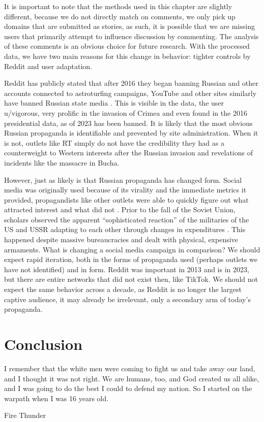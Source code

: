 \documentclass[doublespacing]{utdthesis}
\let\cite=\citep
\begin{document}
It is important to note that the methods used in this chapter are slightly different, because we do not directly match on comments, we only pick up domains that are submitted as stories, as such, it is possible that we are missing users that primarily attempt to influence discussion by commenting.
The analysis of these comments is an obvious choice for future research.
With the processed data, we have two main reasons for this change in behavior: tighter controls by Reddit and user adaptation.

Reddit has publicly stated that after 2016 they began banning Russian and other accounts connected to astroturfing campaigns, YouTube and other sites similarly have banned Russian state media \cite{browne2018}.
This is visible in the data, the user u/vigorous, very prolific in the invasion of Crimea and even found in the 2016 presidential data, as of 2023 has been banned.
It is likely that the most obvious Russian propaganda is identifiable and prevented by site administration.
When it is not, outlets like RT simply do not have the credibility they had as a counterweight to Western interests after the Russian invasion and revelations of incidents like the massacre in Bucha. 

However, just as likely is that Russian propaganda has changed form.
Social media was originally used because of its virality and the immediate metrics it provided, propagandists like other outlets were able to quickly figure out what attracted interest and what did not \cite[p. 28]{woolley2018}.
Prior to the fall of the Soviet Union, scholars observed the apparent ``sophisticated reaction'' of the militaries of the US and USSR adapting to each other through changes in expenditures \cite{williams1988}. 
This happened despite massive bureaucracies and dealt with physical, expensive armaments.
What is changing a social media campaign in comparison?
We should expect rapid iteration, both in the forms of propaganda used (perhaps outlets we have not identified) and in form.
Reddit was important in 2013 and is in 2023, but there are entire networks that did not exist then, like TikTok.
We should not expect the same behavior across a decade, as Reddit is no longer the largest captive audience, it may already be irrelevant, only a secondary arm of today's propaganda.

\chapter{Conclusion}
\epigraph{I remember that the white men were coming to fight us and take away our land, and I thought it was not right. We are humans, too, and God created us all alike, and I was going to do the best I could to defend my nation.  So I started on the warpath when I was 16 years old.}{Fire Thunder}
\end{document}
